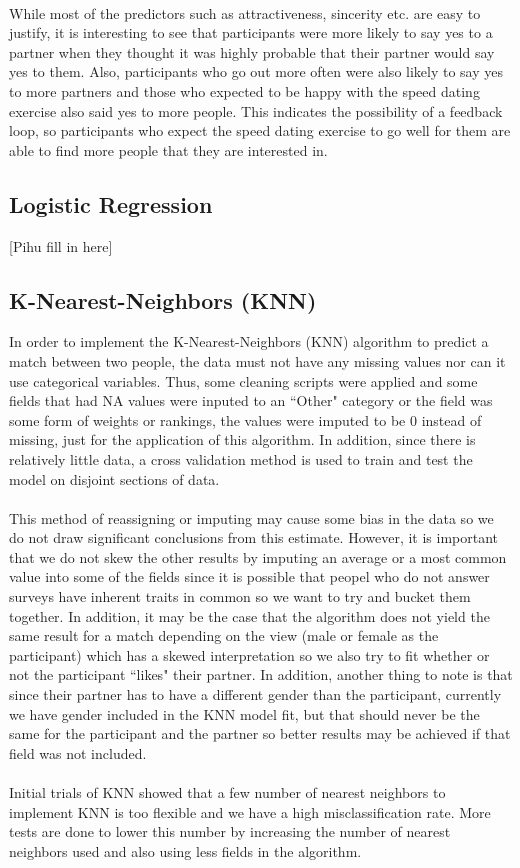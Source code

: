 \documentclass{article}
\begin{document}
\null\\
While most of the predictors such as attractiveness, sincerity etc. are easy to justify, it is interesting to see that participants were more likely to say yes to a partner when they thought it was highly probable that their partner would say yes to them. Also, participants who go out more often were also likely to say yes to more partners and those who expected to be happy with the speed dating exercise also said yes to more people. This indicates the possibility of a feedback loop, so participants who expect the speed dating exercise to go well for them are able to find more people that they are interested in.
%
\subsection{Logistic Regression}
[Pihu fill in here]
\subsection{K-Nearest-Neighbors (KNN)}
In order to implement the K-Nearest-Neighbors (KNN) algorithm to predict a match between two people, the data must not have any missing values nor can it use categorical variables.  Thus, some cleaning scripts were applied and some fields that had NA values were inputed to an ``Other" category or the field was some form of weights or rankings, the values were imputed to be 0 instead of missing, just for the application of this algorithm.  In addition, since there is relatively little data, a cross validation method is used to train and test the model on disjoint sections of data.\\
\null\\
This method of reassigning or imputing may cause some bias in the data so we do not draw significant conclusions from this estimate.  However, it is important that we do not skew the other results by imputing an average or a most common value into some of the fields since it is possible that peopel who do not answer surveys have inherent traits in common so we want to try and bucket them together.  In addition, it may be the case that the algorithm does not yield the same result for a match depending on the view (male or female as the participant) which has a skewed interpretation so we also try to fit whether or not the participant ``likes" their partner.  In addition, another thing to note is that since their partner has to have a different gender than the participant, currently we have gender included in the KNN model fit, but that should never be the same for the participant and the partner so better results may be achieved if that field was not included.\\
\null\\
Initial trials of KNN showed that a few number of nearest neighbors to implement KNN is too flexible and we have a high misclassification rate.  More tests are done to lower this number by increasing the number of nearest neighbors used and also using less fields in the algorithm.
%
\end{document}
